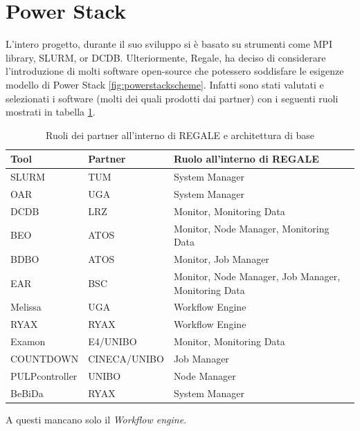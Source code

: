 \section{Power Stack}
L'intero progetto, durante il suo sviluppo si è basato su strumenti come MPI library, SLURM, or DCDB. Ulteriormente, Regale, ha deciso di considerare l'introduzione di molti software open-source che potessero soddisfare le esigenze modello di Power Stack \ref{fig:powerstackscheme}. Infatti sono stati valutati e selezionati i software (molti dei quali prodotti dai partner) con i seguenti ruoli mostrati in tabella \ref{table:REGALE}.
\begin{table}[ht]
    \centering
    \begin{tabular}{l|l|l}
    \hline
    \textbf{Tool} & \textbf{Partner} & \textbf{Ruolo all'interno di REGALE} \\
    \hline
    SLURM & TUM & System Manager \\
    \hline
    OAR & UGA & System Manager \\
    \hline
    DCDB & LRZ & Monitor, Monitoring Data \\
    \hline
    BEO & ATOS & Monitor, Node Manager, Monitoring Data \\
    \hline
    BDBO & ATOS & Monitor, Job Manager \\
    \hline
    EAR & BSC & Monitor, Node Manager, Job Manager, Monitoring Data \\
    \hline
    Melissa & UGA & Workflow Engine \\
    \hline
    RYAX & RYAX & Workflow Engine \\
    \hline
    Examon & E4/UNIBO & Monitor, Monitoring Data \\
    \hline
    COUNTDOWN & CINECA/UNIBO & Job Manager \\
    \hline
    PULPcontroller & UNIBO & Node Manager \\
    \hline
    BeBiDa & RYAX & System Manager \\
    \hline
\end{tabular}
\caption{Ruoli dei partner all'interno di REGALE e architettura di base}\label{table:REGALE}
\end{table}
A questi mancano solo il \emph{Workflow engine}.
